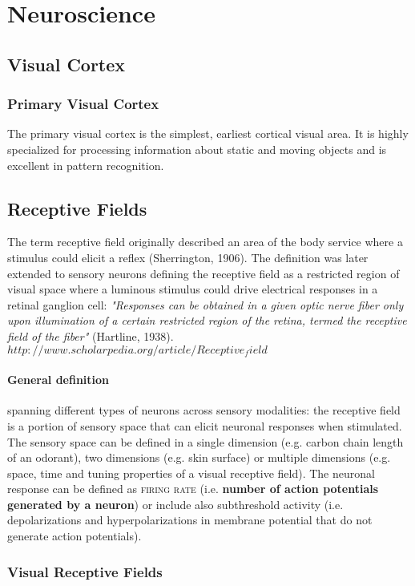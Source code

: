 \documentclass[11pt]{article}
\begin{document}
\section{Neuroscience}

\subsection{Visual Cortex}

\subsubsection{Primary Visual Cortex}
The primary visual cortex is the simplest, earliest cortical visual area. It is highly specialized for processing information about static and moving objects and is excellent in pattern recognition.

\subsection{Receptive Fields}
The term receptive field originally described an area of the body service where a stimulus could elicit a reflex (Sherrington, 1906). The definition was later extended to sensory neurons defining the receptive field as a restricted region of visual space where a luminous stimulus could drive electrical responses in a retinal ganglion cell: \textit{"Responses can be obtained in a given optic nerve fiber only upon illumination of a certain restricted region of the retina, termed the receptive field of the fiber"} (Hartline, 1938).
$http://www.scholarpedia.org/article/Receptive_field$
\paragraph*{General definition} spanning different types of neurons across sensory modalities: the receptive field is a portion of sensory space that can elicit neuronal responses when stimulated. The sensory space can be defined in a single dimension (e.g. carbon chain length of an odorant), two dimensions (e.g. skin surface) or multiple dimensions (e.g. space, time and tuning properties of a visual receptive field). The neuronal response can be defined as \textsc{firing rate} (i.e. \textbf{number of action potentials generated by a neuron}) or include also subthreshold activity (i.e. depolarizations and hyperpolarizations in membrane potential that do not generate action potentials).

\subsubsection{Visual Receptive Fields}
\end{document}
